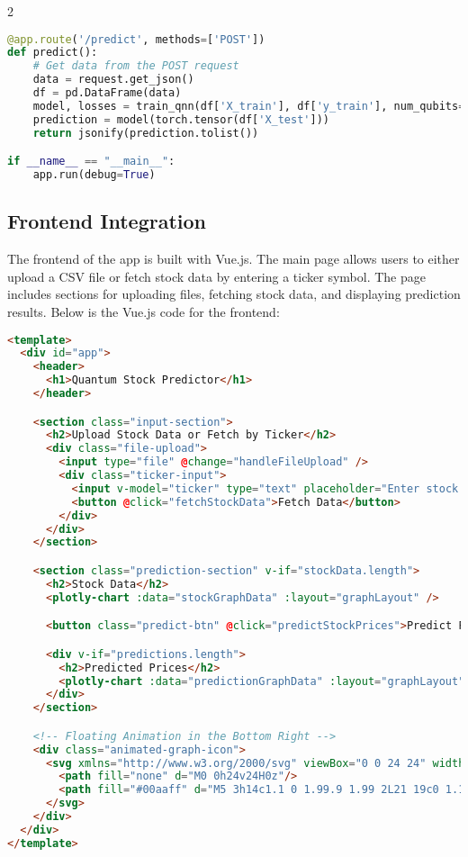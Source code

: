 \documentclass[12pt]{article}
\begin{document}
\begin{multicols}{2}
\begin{lstlisting}[language=Python, caption=Flask Backend for QNN Prediction]
@app.route('/predict', methods=['POST'])
def predict():
    # Get data from the POST request
    data = request.get_json()
    df = pd.DataFrame(data)
    model, losses = train_qnn(df['X_train'], df['y_train'], num_qubits=4, epochs=10, learning_rate=0.01)
    prediction = model(torch.tensor(df['X_test']))
    return jsonify(prediction.tolist())

if __name__ == "__main__":
    app.run(debug=True)
\end{lstlisting}

\subsection{Frontend Integration}
The frontend of the app is built with Vue.js. The main page allows users to either upload a CSV file or fetch stock data by entering a ticker symbol. The page includes sections for uploading files, fetching stock data, and displaying prediction results. Below is the Vue.js code for the frontend:

\begin{lstlisting}[language=HTML, caption=Vue.js Frontend for User Interaction]
<template>
  <div id="app">
    <header>
      <h1>Quantum Stock Predictor</h1>
    </header>

    <section class="input-section">
      <h2>Upload Stock Data or Fetch by Ticker</h2>
      <div class="file-upload">
        <input type="file" @change="handleFileUpload" />
        <div class="ticker-input">
          <input v-model="ticker" type="text" placeholder="Enter stock ticker (e.g., AAPL)" />
          <button @click="fetchStockData">Fetch Data</button>
        </div>
      </div>
    </section>

    <section class="prediction-section" v-if="stockData.length">
      <h2>Stock Data</h2>
      <plotly-chart :data="stockGraphData" :layout="graphLayout" />

      <button class="predict-btn" @click="predictStockPrices">Predict Future Prices</button>

      <div v-if="predictions.length">
        <h2>Predicted Prices</h2>
        <plotly-chart :data="predictionGraphData" :layout="graphLayout" />
      </div>
    </section>

    <!-- Floating Animation in the Bottom Right -->
    <div class="animated-graph-icon">
      <svg xmlns="http://www.w3.org/2000/svg" viewBox="0 0 24 24" width="50" height="50">
        <path fill="none" d="M0 0h24v24H0z"/>
        <path fill="#00aaff" d="M5 3h14c1.1 0 1.99.9 1.99 2L21 19c0 1.1-.89 2-1.99 2H5c-1.1 0-1.99-.9-1.99-2L3 5c0-1.1.89-2 1.99-2zm0 2v14h14V5H5zm7 6h5v2h-5v-2zm0-4h5v2h-5V7zm0 8h5v2h-5v-2z"/>
      </svg>
    </div>
  </div>
</template>
\end{lstlisting}


\end{multicols}
\end{document}
